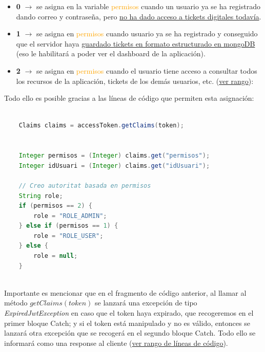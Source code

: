 \documentclass[a4paper,12pt]{report}
\begin{document}
		  
		  \begin{itemize} 
			  \setlength{\itemsep}{-1pt}
			  \item \textbf{0} $\rightarrow$ se asigna en la variable \textcolor{orange}{permisos} cuando un usuario ya se ha registrado dando correo y contraseña, pero \underline{no ha dado acceso a tickets digitales todavía}.
			  
			  \item \textbf{1}   $\rightarrow$ se asigna en \textcolor{orange}{permisos} cuando usuario ya se ha registrado y conseguido que el servidor haya \underline{guardado tickets en formato estructurado en mongoDB} (eso le habilitará a poder ver el dashboard de la aplicación).
			  
			  \item \textbf{2}   $\rightarrow$ se asigna en \textcolor{orange}{permisos} cuando el usuario tiene acceso a consultar todos los recursos de la aplicación, tickets de los demás usuarios, etc. (\href{https://github.com/blackcub3s/mercApp/blob/89efcf854d8bbab2addde3f7e817eb97f7737b95/APP%20WEB/__springboot__produccio__/app/src/main/java/miApp/app/seguretat/FiltreAutenticacioJwt.java#L56-L66}{ver rango}):
		  
		  \end{itemize}
		  
		  Todo ello es posible gracias a las líneas de código que permiten esta asignación:
		  \begin{lstlisting}[language=Java, basicstyle=\ttfamily\footnotesize, keywordstyle=\color{magenta}]
		  
	Claims claims = accessToken.getClaims(token);
	
	
	Integer permisos = (Integer) claims.get("permisos"); 
	Integer idUsuari = (Integer) claims.get("idUsuari"); 
	
	// Creo autoritat basada en permisos
	String role;
	if (permisos == 2) {
	  	role = "ROLE_ADMIN";
	} else if (permisos == 1) {
	  	role = "ROLE_USER";
	} else {
	  	role = null;
	}
		  
		  \end{lstlisting}
		  
		  Importante es mencionar que en el fragmento de código anterior, al llamar al método $getClaims(token)$  se lanzará una excepción de tipo \textit{ExpiredJwtException} en caso que el token haya expirado, que recogeremos en el primer bloque Catch; y si el token está manipulado y no es válido, entonces se lanzará otra excepción que se recogerá en el segundo bloque Catch. Todo ello se informará como una response al cliente (\href{https://github.com/blackcub3s/mercApp/blob/89efcf854d8bbab2addde3f7e817eb97f7737b95/APP%20WEB/__springboot__produccio__/app/src/main/java/miApp/app/seguretat/FiltreAutenticacioJwt.java#L96-L115}{ver rango de líneas de código}).
		  
\end{document}
